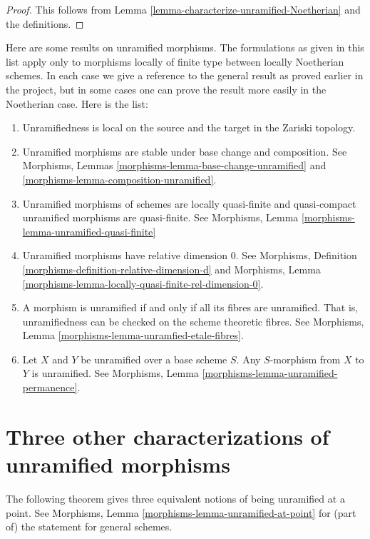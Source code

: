 \begin{proof}
This follows from Lemma \ref{lemma-characterize-unramified-Noetherian}
and the definitions.
\end{proof}

\noindent
Here are some results on unramified morphisms.
The formulations as given in this list apply only to
morphisms locally of finite type between locally Noetherian schemes.
In each case we give a reference to the general result as
proved earlier in the project, but in some cases one can
prove the result more easily in the Noetherian case.
Here is the list:
\begin{enumerate}
\item Unramifiedness is local on the source and the target in the Zariski
topology.
\item Unramified morphisms are stable under base change and composition.
See Morphisms, Lemmas \ref{morphisms-lemma-base-change-unramified}
and \ref{morphisms-lemma-composition-unramified}.
\item Unramified morphisms of schemes are locally quasi-finite
and quasi-compact unramified morphisms are quasi-finite.
See Morphisms, Lemma \ref{morphisms-lemma-unramified-quasi-finite}
\item Unramified morphisms have relative dimension $0$. See
Morphisms, Definition \ref{morphisms-definition-relative-dimension-d}
and
Morphisms, Lemma \ref{morphisms-lemma-locally-quasi-finite-rel-dimension-0}.
\item A morphism is unramified if and only if all its fibres are unramified.
That is, unramifiedness can be checked on the scheme theoretic fibres. See
Morphisms, Lemma \ref{morphisms-lemma-unramfied-etale-fibres}.
\item Let $X$ and $Y$ be unramified over a base scheme $S$.
Any $S$-morphism from $X$ to $Y$ is unramified.
See Morphisms, Lemma \ref{morphisms-lemma-unramified-permanence}.
\end{enumerate}

\section{Three other characterizations of unramified morphisms}
\label{section-three-other}

\noindent
The following theorem gives three equivalent notions of being
unramified at a point. See
Morphisms, Lemma \ref{morphisms-lemma-unramified-at-point}
for (part of) the statement for general schemes.

